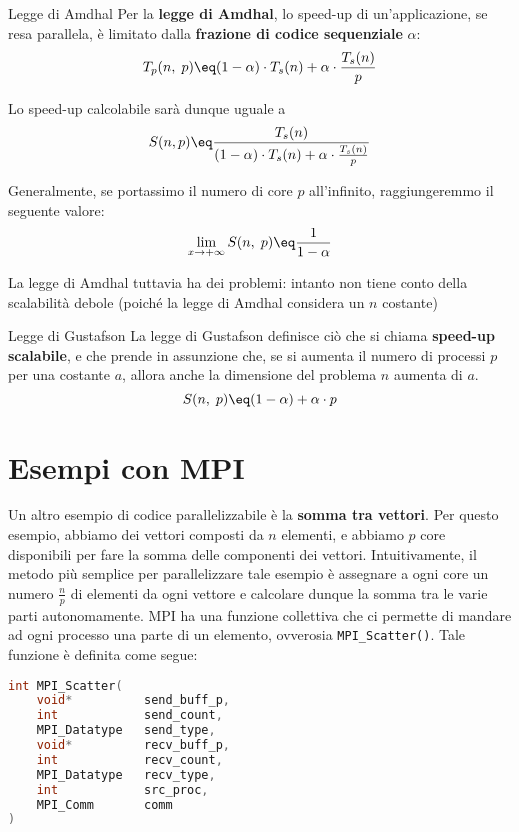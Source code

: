 \begin{definition}{Legge di Amdhal}
    Per la \textbf{legge di Amdhal}, lo speed-up di un'applicazione, se resa parallela, è limitato dalla \textbf{frazione di codice sequenziale} $\alpha$:
    \[ T_p(n, \; p) \eq (1 - \alpha) \cdot T_s(n) + \alpha \cdot \frac{T_s(n)}{p} \]

    Lo speed-up calcolabile sarà dunque uguale a
    \[ S(n, p) \eq \frac{T_s(n)}{(1 - \alpha) \cdot T_s(n) + \alpha \cdot \frac{T_s(n)}{p}} \]
\end{definition}

Generalmente, se portassimo il numero di core $p$ all'infinito, raggiungeremmo il seguente valore:
\[ \lim_{x \to +\infty} S(n, \; p) \eq \frac{1}{1 - \alpha} \]

\noindent La legge di Amdhal tuttavia ha dei problemi: intanto non tiene conto della scalabilità debole (poiché la legge di Amdhal considera un $n$ costante) %

\begin{definition}{Legge di Gustafson}
    La legge di Gustafson definisce ciò che si chiama \textbf{speed-up scalabile}, e che prende in assunzione che, se si aumenta il numero di processi $p$ per una costante $a$, allora anche la dimensione del problema $n$ aumenta di $a$.
    \[ S(n, \; p) \eq (1 - \alpha) + \alpha \cdot p \]
\end{definition}

\section{Esempi con MPI}


Un altro esempio di codice parallelizzabile è la \textbf{somma tra vettori}. Per questo esempio, abbiamo dei vettori composti da $n$ elementi, e abbiamo $p$ core disponibili per fare la somma delle componenti dei vettori. Intuitivamente, il metodo più semplice per parallelizzare tale esempio è assegnare a ogni core un numero $\frac{n}{p}$ di elementi da ogni vettore e calcolare dunque la somma tra le varie parti autonomamente.
\nl
MPI ha una funzione collettiva che ci permette di mandare ad ogni processo una parte di un elemento, ovverosia \verb|MPI_Scatter()|. Tale funzione è definita come segue:

\begin{lstlisting}[language = C, numbers = none]
int MPI_Scatter(
    void*          send_buff_p,
    int            send_count,
    MPI_Datatype   send_type,
    void*          recv_buff_p,
    int            recv_count,
    MPI_Datatype   recv_type,
    int            src_proc,
    MPI_Comm       comm
)\end{lstlisting}

